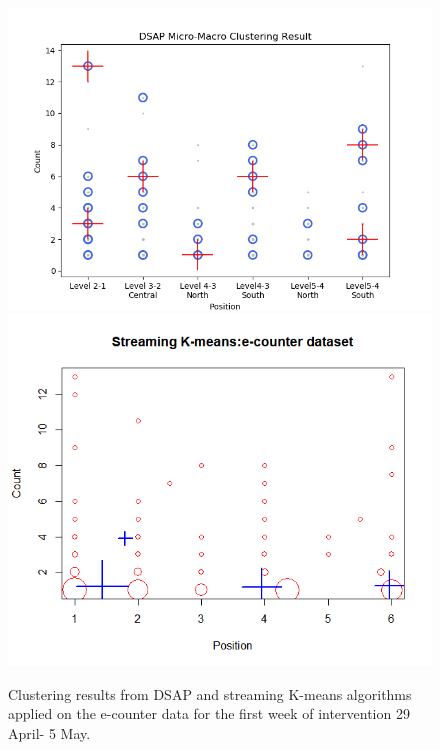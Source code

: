 \documentclass[../UNBThesis2.tex]{subfiles}
\begin{document}
\begin{figure}[]
    \centering
    \includegraphics[width=.49\textwidth]{image/Chapters/Chapter6/window10H.png}%
    \includegraphics[width=.49\textwidth]{image/Chapters/Chapter6/firstweekinterK.png}
    \caption{Clustering results from DSAP and streaming K-means algorithms applied on the e-counter data for the first week of intervention 29 April- 5 May.}
    \label{6}
\end{figure}
\end{document}

